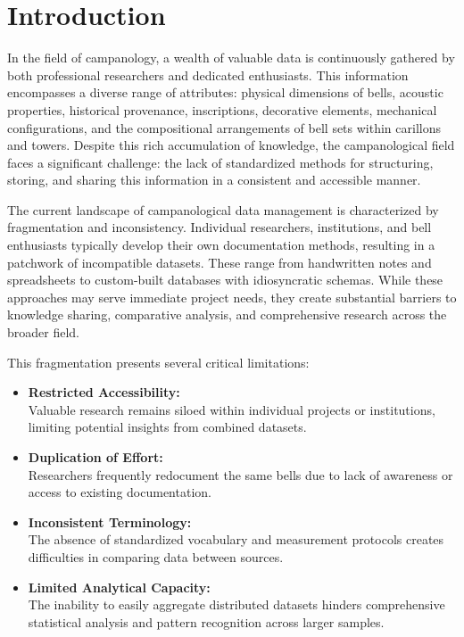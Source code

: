 \documentclass[11pt, a4paper]{article}
\begin{document}

\clearpage
\setcounter{page}{1}
\tableofcontents
\clearpage


\section{Introduction}

In the field of campanology, a wealth of valuable data is continuously gathered 
by both professional researchers and dedicated enthusiasts. This information 
encompasses a diverse range of attributes: physical dimensions of bells, acoustic 
properties, historical provenance, inscriptions, decorative elements, mechanical 
configurations, and the compositional arrangements of bell sets within carillons 
and towers. Despite this rich accumulation of knowledge, the campanological field 
faces a significant challenge: the lack of standardized methods for structuring, 
storing, and sharing this information in a consistent and accessible manner.

The current landscape of campanological data management is characterized by fragmentation 
and inconsistency. Individual researchers, institutions, and bell enthusiasts typically 
develop their own documentation methods, resulting in a patchwork of incompatible datasets. 
These range from handwritten notes and spreadsheets to custom-built databases with idiosyncratic 
schemas. While these approaches may serve immediate project needs, they create substantial 
barriers to knowledge sharing, comparative analysis, and comprehensive research across the broader field.

This fragmentation presents several critical limitations:

\begin{itemize}
    \item \textbf{Restricted Accessibility:} \\
        Valuable research remains siloed within individual projects or institutions, limiting potential insights from combined datasets.
    \item \textbf{Duplication of Effort:} \\
        Researchers frequently redocument the same bells due to lack of awareness or access to existing documentation.
    \item \textbf{Inconsistent Terminology:} \\
        The absence of standardized vocabulary and measurement protocols creates difficulties in comparing data between sources.
    \item \textbf{Limited Analytical Capacity:} \\
        The inability to easily aggregate distributed datasets hinders comprehensive statistical analysis and pattern recognition across larger samples.
\end{itemize}
\end{document}

